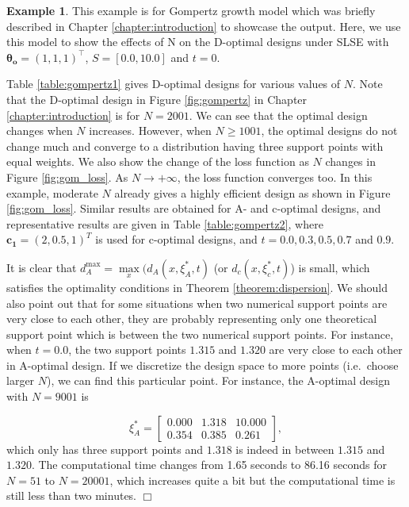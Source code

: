 \documentclass[
]{book}
\theoremstyle{definition}
\theoremstyle{definition}
\newtheorem{example}{Example}[chapter]
\theoremstyle{definition}
\theoremstyle{definition}
\theoremstyle{remark}
\begin{document}
\begin{example}
\protect\hypertarget{exm:gompertz}{}\label{exm:gompertz}This example is for Gompertz growth model which was briefly described in Chapter \ref{chapter:introduction} to showcase the output. Here, we use this model to show the effects of N on the D-optimal designs under SLSE with \(\boldsymbol{\theta_o}=(1,1,1)^\top\), \(S=[0.0,10.0]\) and \(t=0\).

Table \ref{table:gompertz1} gives D-optimal designs for various values of \(N\). Note that the D-optimal design in Figure \ref{fig:gompertz} in Chapter \ref{chapter:introduction} is for \(N=2001\). We can see that the optimal design changes when \(N\) increases. However, when \(N\ge 1001\), the optimal designs do not change much and converge to a distribution having three support points with equal weights. We also show the change of the loss function as \(N\) changes in Figure \ref{fig:gom_loss}. As \(N\rightarrow +\infty\), the loss function converges too. In this example, moderate \(N\) already gives a highly efficient design as shown in Figure \ref{fig:gom_loss}. Similar results are obtained for A- and c-optimal designs, and representative results are given in Table \ref{table:gompertz2}, where \(\boldsymbol{c_1}=(2,0.5,1)^T\) is used for c-optimal designs, and \(t= 0.0, 0.3, 0.5, 0.7\) and \(0.9\).

It is clear that \(d_A^{\max}=\max\limits_{x}(d_A(x,\xi_A^*,t)\) (or \(d_c(x,\xi_c^*,t)\)) is small, which satisfies the optimality conditions in Theorem \ref{theorem:dispersion}. We should also point out that for some situations when two numerical support points are very close to each other, they are probably representing only one theoretical support point which is between the two numerical support points. For instance, when \(t=0.0\), the two support points \(1.315\) and \(1.320\) are very close to each other in A-optimal design. If we discretize the design space to more points (i.e.~choose larger \(N\)), we can find this particular point. For instance, the A-optimal design with \(N=9001\) is

\[ 
    \xi_A^*=\begin{bmatrix}
                0.000   &   1.318   &   10.000\\
                0.354   &   0.385   &   0.261
    \end{bmatrix},
\]
which only has three support points and \(1.318\) is indeed in between \(1.315\) and \(1.320\).
The computational time changes from 1.65 seconds to 86.16 seconds for \(N=51\) to \(N=20001\), which increases quite a bit but the computational time is still less than two minutes.
\hfill\(\Box\)
\end{example}
\end{document}
